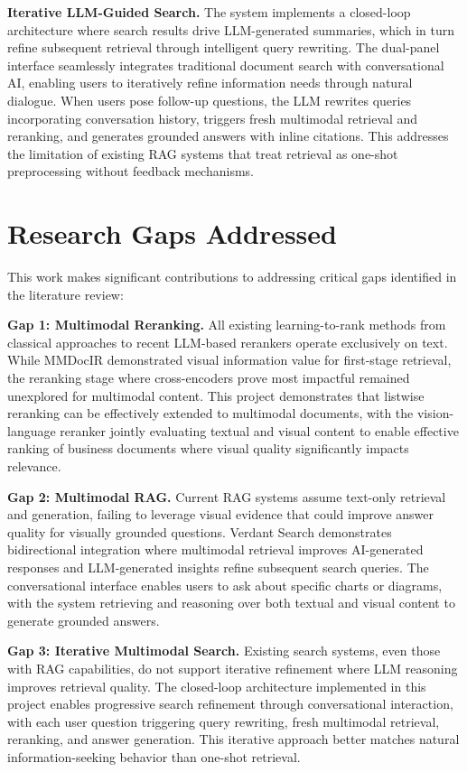 \textbf{Iterative LLM-Guided Search.} The system implements a closed-loop architecture where search results drive LLM-generated summaries, which in turn refine subsequent retrieval through intelligent query rewriting. The dual-panel interface seamlessly integrates traditional document search with conversational AI, enabling users to iteratively refine information needs through natural dialogue. When users pose follow-up questions, the LLM rewrites queries incorporating conversation history, triggers fresh multimodal retrieval and reranking, and generates grounded answers with inline citations. This addresses the limitation of existing RAG systems that treat retrieval as one-shot preprocessing without feedback mechanisms.

\section{Research Gaps Addressed}

This work makes significant contributions to addressing critical gaps identified in the literature review:

\textbf{Gap 1: Multimodal Reranking.} All existing learning-to-rank methods from classical approaches to recent LLM-based rerankers operate exclusively on text. While MMDocIR demonstrated visual information value for first-stage retrieval, the reranking stage where cross-encoders prove most impactful remained unexplored for multimodal content. This project demonstrates that listwise reranking can be effectively extended to multimodal documents, with the vision-language reranker jointly evaluating textual and visual content to enable effective ranking of business documents where visual quality significantly impacts relevance.

\textbf{Gap 2: Multimodal RAG.} Current RAG systems assume text-only retrieval and generation, failing to leverage visual evidence that could improve answer quality for visually grounded questions. Verdant Search demonstrates bidirectional integration where multimodal retrieval improves AI-generated responses and LLM-generated insights refine subsequent search queries. The conversational interface enables users to ask about specific charts or diagrams, with the system retrieving and reasoning over both textual and visual content to generate grounded answers.

\textbf{Gap 3: Iterative Multimodal Search.} Existing search systems, even those with RAG capabilities, do not support iterative refinement where LLM reasoning improves retrieval quality. The closed-loop architecture implemented in this project enables progressive search refinement through conversational interaction, with each user question triggering query rewriting, fresh multimodal retrieval, reranking, and answer generation. This iterative approach better matches natural information-seeking behavior than one-shot retrieval.

